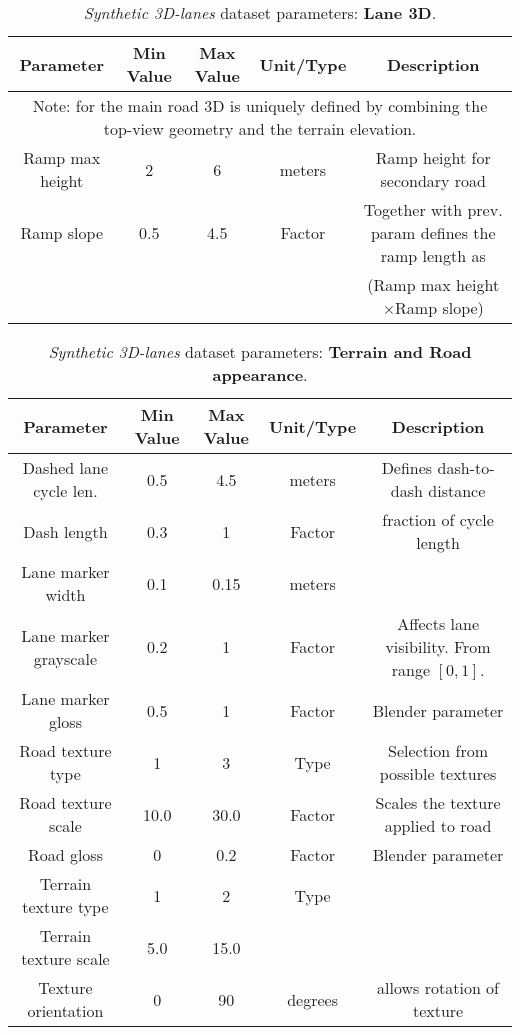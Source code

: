 \documentclass[10pt,twocolumn,letterpaper]{article}
\begin{document}
\begin{table*}[h]
	\centering
	\caption{\emph{Synthetic 3D-lanes} dataset parameters: \textbf{Lane 3D}.}
	\begin{tabular} {*5c}
		\toprule
		\textbf{Parameter} &  \textbf{Min Value} &  \textbf{Max Value} & \textbf{Unit/Type} & \textbf{Description}  \\
		\toprule
		\multicolumn{5}{c}{Note: for the main road 3D is uniquely defined by combining the top-view geometry and the terrain elevation.}	\\	
		\midrule
		Ramp max height	& 2 & 6 &	meters & Ramp height for secondary road\\
		\midrule
		Ramp slope	& 0.5 & 4.5 &	Factor & Together with prev. param defines the ramp length as \\
		& & & & (Ramp max height$\times$Ramp slope) \\
		
		\bottomrule
		
	\end{tabular} 
	\label{tab:real}
\end{table*}

\vspace{5cm}

\begin{table*}[h]
	\centering
	\caption{\emph{Synthetic 3D-lanes} dataset parameters: \textbf{Terrain and Road appearance}.}
	\begin{tabular} {*5c}
		\toprule
		\textbf{Parameter} &  \textbf{Min Value} &  \textbf{Max Value} & \textbf{Unit/Type} & \textbf{Description}  \\
		\toprule		
		Dashed lane cycle len.& 0.5 & 4.5 & meters & Defines dash-to-dash distance\\
		\midrule
		Dash length & 0.3 & 1 & Factor & fraction of cycle length\\
		\midrule
		Lane marker width & 0.1 & 0.15 & meters & \\
		\midrule
		Lane marker grayscale & 0.2 & 1 & Factor & Affects lane visibility. From range $[0,1]$. \\
		Lane marker gloss & 0.5 & 1 & Factor & Blender parameter\\
		\midrule
		Road texture type & 1 & 3 & Type & Selection from possible textures\\
		\midrule
		Road texture scale & 10.0 & 30.0 & Factor & Scales the texture applied to road\\
		\midrule
		Road gloss & 0 & 0.2 & Factor & Blender parameter\\
		\midrule
		Terrain texture type & 1 &  2 & Type & \\
		\midrule
		Terrain texture scale  & 5.0 & 15.0 & \\
		\midrule
		Texture orientation & 0 & 90 & degrees & allows rotation of texture\\
		\bottomrule
		
	\end{tabular} 
	\label{tab:real}
\end{table*}
\end{document}
